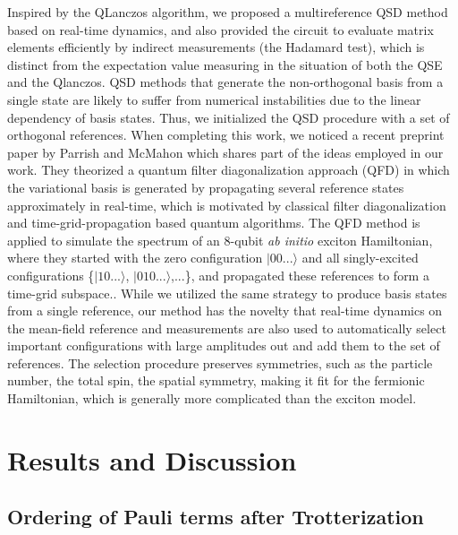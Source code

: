 \documentclass[journal=jctcce,manuscript=article]{achemso}
\begin{document}
Inspired by the QLanczos algorithm, we proposed a multireference QSD method based on real-time dynamics, and also provided the circuit to evaluate matrix elements efficiently by indirect measurements (the Hadamard test),\cite{aharonov2009polynomial} which is distinct from the expectation value measuring in the situation of both the QSE\cite{McClean:2017ct} and the Qlanczos.\cite{Motta:2019bu}
QSD methods that generate the non-orthogonal basis from a single state are likely to suffer from numerical instabilities due to the linear dependency of basis states.\cite{Motta:2019bu,Huggins:2019vv} Thus, we initialized the QSD procedure with a set of orthogonal references.
When completing this work, we noticed a recent preprint paper by Parrish and McMahon\cite{Parrish:2019tc} which shares part of the ideas employed in our work. 
They theorized a quantum filter diagonalization approach (QFD) in which the variational basis is generated by propagating several reference states approximately in real-time, which is motivated by classical filter diagonalization\cite{Neuhauser:1994jp,Neuhauser:1990dp,wall1995extraction, mandelshtam1997low} and time-grid-propagation based quantum algorithms.\cite{Somma:2002jo,Somma:2019th,OBrien:2019cw,Kyriienko:2020gg} 
The QFD method is applied to simulate the spectrum of an 8-qubit \textit{ab initio} exciton Hamiltonian, where they started with the zero configuration $|00...\rangle$ and all singly-excited configurations \{$|10...\rangle$, $|010...\rangle$,...\}, and propagated these references to form a time-grid subspace.\cite{Parrish:2019tc}.
While we utilized the same strategy to produce basis states from a single reference, our method has the novelty that real-time dynamics on the mean-field reference and measurements are also used to automatically select important configurations with large amplitudes out and add them to the set of references. The selection procedure preserves symmetries, such as the particle number, the total spin, the spatial symmetry, making it fit for the fermionic Hamiltonian, which is generally more complicated than the exciton model.


\section{Results and Discussion}


\subsection{Ordering of Pauli terms after Trotterization}
\end{document}
